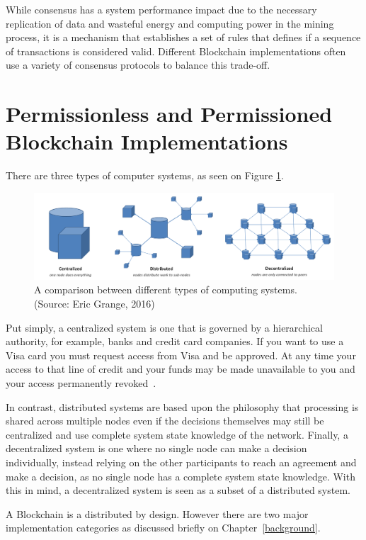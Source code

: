 While consensus has a system performance impact due to the
necessary replication of data and wasteful energy and computing power in the mining process, it is a mechanism that establishes a set of
rules that defines if a sequence of transactions is considered valid.
Different Blockchain implementations often use a variety of consensus protocols to
balance this trade-off.

\section{Permissionless and Permissioned Blockchain Implementations}

There are three types of computer systems, as seen on Figure
\ref{fig:typesofnetworks}.

\begin{figure}[h]
	\centering
	\includegraphics[width=1\linewidth]{imgs/typesofnetworks.png}
  \caption{\label{fig:typesofnetworks} A comparison between different types of
  computing systems. (Source: Eric Grange, 2016)}
\end{figure}

Put simply, a centralized system is one that is governed by a hierarchical
authority, for example, banks and credit card companies. If you want to use a
Visa card you must request access from Visa and be approved. At any time your
access to that line of credit and your funds may be made unavailable to you and
your access permanently revoked~\cite{Dreifuerst2018}.

In contrast, distributed systems are based upon the philosophy that processing
is shared across multiple nodes even if the decisions themselves may still be
centralized and use complete system state knowledge of the network. Finally, a
decentralized system is one where no single node can make a decision
individually, instead relying on the other participants to reach an agreement
and make a decision, as no single node has a complete system state knowledge.
With this in mind, a decentralized system is seen as a subset of a distributed
system.

A Blockchain is a distributed by design. However there are two major
implementation categories as discussed briefly on Chapter~\ref{background}.

